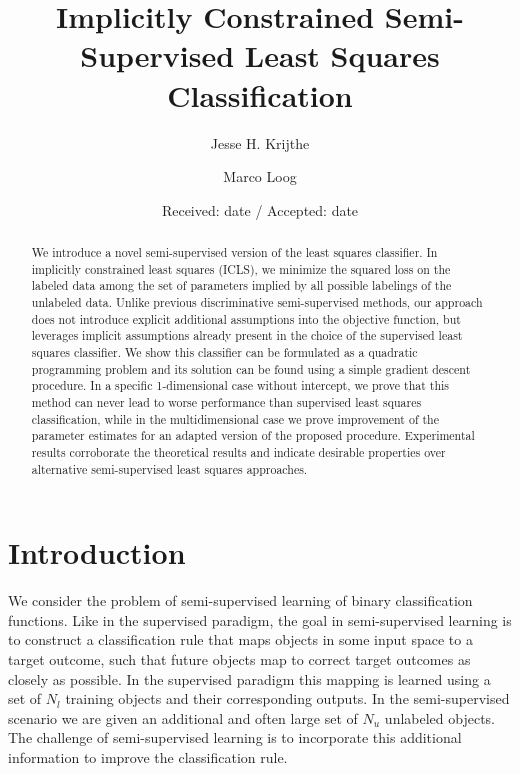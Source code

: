 \documentclass[smallcondensed]{svjour3}
\begin{document}
\title{Implicitly Constrained Semi-Supervised Least Squares Classification}
\subtitle{}
\author{Jesse H. Krijthe \and Marco Loog}


\date{Received: date / Accepted: date}

\maketitle


\begin{abstract}
We introduce a novel semi-supervised version of the least squares classifier. In implicitly constrained least squares (ICLS), we minimize the squared loss on the labeled data among the set of parameters implied by all possible labelings of the unlabeled data. Unlike previous discriminative semi-supervised methods, our approach does not introduce explicit additional assumptions into the objective function, but leverages implicit assumptions already present in the choice of the supervised least squares classifier.  We show this classifier can be formulated as a quadratic programming problem and its solution can be found using a simple gradient descent procedure. In a specific 1-dimensional case without intercept, we prove that this method can never lead to worse performance than supervised least squares classification, while in the multidimensional case we prove improvement of the parameter estimates for an adapted version of the proposed procedure. Experimental results corroborate the theoretical results and indicate desirable properties over alternative semi-supervised least squares approaches. 

\end{abstract}

\section{Introduction}
We consider the problem of semi-supervised learning of binary classification functions. Like in the supervised paradigm, the goal in semi-supervised learning is to construct a classification rule that maps objects in some input space to a target outcome, such that future objects map to correct target outcomes as closely as possible. In the supervised paradigm this mapping is learned using a set of $N_l$ training objects and their corresponding outputs. In the semi-supervised scenario we are given an additional and often large set of $N_u$ unlabeled objects. The challenge of semi-supervised learning is to incorporate this additional information to improve the classification rule.
\end{document}
